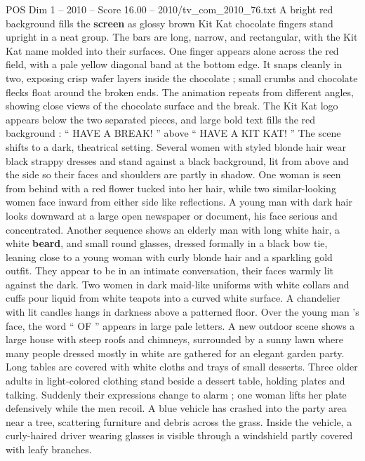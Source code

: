 \begin{textsample}{POS Dim 1 – 2010 – Score 16.00 – 2010/tv\_com\_2010\_76.txt}  \label{ex:f1_pos_027}
A bright red background fills the \textbf{screen} as glossy brown Kit Kat chocolate fingers stand upright in a neat group.
The bars are long, narrow, and rectangular, with the Kit Kat name molded into their surfaces.
One finger appears alone across the red field, with a pale yellow diagonal band at the bottom edge.
It snaps cleanly in two, exposing crisp wafer layers inside the chocolate ; small crumbs and chocolate flecks float around the broken ends.
The animation repeats from different angles, showing close views of the chocolate surface and the break.
The Kit Kat logo appears below the two separated pieces, and large bold text fills the red background : “ HAVE A BREAK! ” above “ HAVE A KIT KAT! ” The scene shifts to a dark, theatrical setting.
Several women with styled blonde hair wear black strappy dresses and stand against a black background, lit from above and the side so their faces and shoulders are partly in shadow.
One woman is seen from behind with a red flower tucked into her hair, while two similar-looking women face inward from either side like reflections.
A young man with dark hair looks downward at a large open newspaper or document, his face serious and concentrated.
Another sequence shows an elderly man with long white hair, a white \textbf{beard}, and small round glasses, dressed formally in a black bow tie, leaning close to a young woman with curly blonde hair and a sparkling gold outfit.
They appear to be in an intimate conversation, their faces warmly lit against the dark.
Two women in dark maid-like uniforms with white collars and cuffs pour liquid from white teapots into a curved white surface.
A chandelier with lit candles hangs in darkness above a patterned floor.
Over the young man ’s face, the word “ OF ” appears in large pale letters.
A new outdoor scene shows a large house with steep roofs and chimneys, surrounded by a sunny lawn where many people dressed mostly in white are gathered for an elegant garden party.
Long tables are covered with white cloths and trays of small desserts.
Three older adults in light-colored clothing stand beside a dessert table, holding plates and talking.
Suddenly their expressions change to alarm ; one woman lifts her plate defensively while the men recoil.
A blue vehicle has crashed into the party area near a tree, scattering furniture and debris across the grass.
Inside the vehicle, a curly-haired driver wearing glasses is visible through a windshield partly covered with leafy branches.

\end{textsample}
